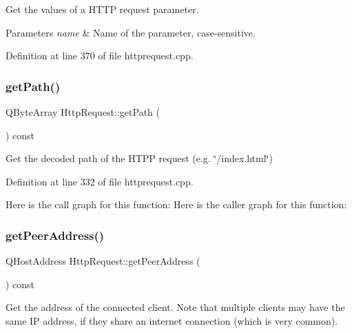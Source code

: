 Get the values of a H\+T\+TP request parameter. 
\begin{DoxyParams}{Parameters}
{\em name} & Name of the parameter, case-\/sensitive. \\
\hline
\end{DoxyParams}


Definition at line 370 of file httprequest.\+cpp.

\mbox{\label{classstefanfrings_1_1_http_request_a9e9f87cc06cdeae2ca03c97d576c217b}} 
\subsubsection{\texorpdfstring{get\+Path()}{getPath()}}
{\footnotesize\ttfamily Q\+Byte\+Array Http\+Request\+::get\+Path (\begin{DoxyParamCaption}{ }\end{DoxyParamCaption}) const}

Get the decoded path of the H\+T\+PP request (e.\+g. \char`\"{}/index.\+html\char`\"{}) 

Definition at line 332 of file httprequest.\+cpp.

Here is the call graph for this function\+:
Here is the caller graph for this function\+:
\mbox{\label{classstefanfrings_1_1_http_request_ae7cd8408c9b67f1632784468ace2d560}} 
\subsubsection{\texorpdfstring{get\+Peer\+Address()}{getPeerAddress()}}
{\footnotesize\ttfamily Q\+Host\+Address Http\+Request\+::get\+Peer\+Address (\begin{DoxyParamCaption}{ }\end{DoxyParamCaption}) const}

Get the address of the connected client. Note that multiple clients may have the same IP address, if they share an internet connection (which is very common). 

